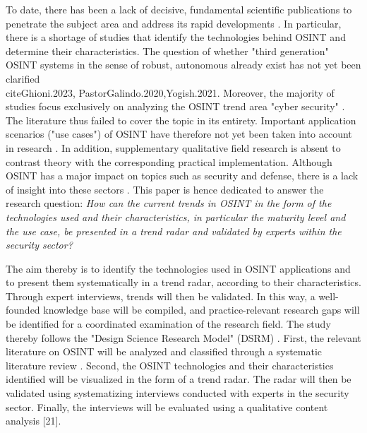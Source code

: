 \documentclass[10pt]{article}
\begin{document}
To date, there has been a lack of decisive, fundamental scientific publications to penetrate
the subject area \cite{HerreraCubides.2020} and address its rapid
developments \cite{Ghioni.2023, Williams.2018}. In particular, there is a shortage of
studies that identify the technologies behind OSINT and determine their characteristics.
The question of whether "third generation" OSINT systems in the sense of
robust, autonomous \cite{PastorGalindo.2019, PastorGalindo.2020} already exist
has not yet been clarified \\cite{Ghioni.2023, PastorGalindo.2020,Yogish.2021}.
Moreover, the majority of studies focus exclusively on analyzing the OSINT trend area "cyber
security" \cite{Hwang.2022, PastorGalindo.2019, Yogish.2021}. The literature thus failed to
cover the topic in its entirety. Important application scenarios ("use cases") of OSINT have
therefore not yet been taken into account in research \cite{AlKilani.2021, Dokman.2020, Ghioni.2023}.
In addition, supplementary qualitative field research is absent to contrast theory with
the corresponding practical implementation. Although OSINT has a major impact on topics
such as security and defense, there is a lack of insight into these sectors \cite{HerreraCubides.2020, PastorGalindo.2019}.
This paper is hence dedicated to answer the research question:
\textit{How can the current trends in OSINT in the form of the technologies used and their
    characteristics, in particular the maturity level and the use case, be presented in a
    trend radar and validated by experts within the security sector?}

The aim thereby is to identify the technologies used in OSINT applications and to present
them systematically in a trend radar, according to their characteristics. Through expert
interviews, trends will then be validated. In this way, a well-founded knowledge base will
be compiled, and practice-relevant research gaps will be identified for a coordinated examination
of the research field. The study thereby follows the "Design Science Research Model" (DSRM)
\cite{Peffers.2007}.  First, the relevant literature on OSINT will be analyzed and classified
through a systematic literature review \cite{Webster.2002}. Second, the OSINT technologies and
their characteristics identified will be visualized in the form of a trend radar. The radar
will then be validated using systematizing interviews \cite{Bogner.2014} conducted with
experts in the security sector. Finally, the interviews will be evaluated using a
qualitative content analysis [21].
\end{document}
